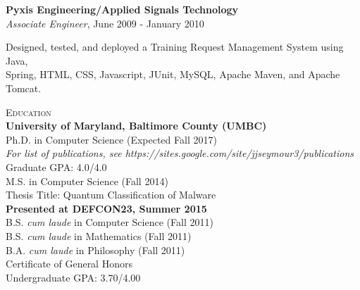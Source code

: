 \atab \textbf{Pyxis Engineering/Applied Signals Technology}\\
\btab \textit{Associate Engineer}, June 2009 - January 2010\\
\begin{my_list}
\item Designed, tested, and deployed a Training Request Management System using Java,\\ \tab \tab  Spring, HTML, CSS, Javascript, JUnit, MySQL, Apache Maven, and Apache Tomcat.
\end{my_list}

\medskip
\textsc{Education}\\
\atab \textbf{University of Maryland, Baltimore County (UMBC)}\\
\btab Ph.D. in Computer Science (Expected Fall 2017)\\
\ctab \emph{For list of publications, see https://sites.google.com/site/jjseymour3/publications}\\
\ctab Graduate GPA: 4.0/4.0\\
\btab M.S. in Computer Science (Fall 2014)\\
\ctab Thesis Title: Quantum Classification of Malware\\
\ctab \textbf{Presented at DEFCON23, Summer 2015}\\
\btab B.S. \emph{cum laude} in Computer Science (Fall 2011)\\
\btab B.S. \emph{cum laude} in Mathematics (Fall 2011) \\
\btab B.A. \emph{cum laude} in Philosophy (Fall 2011)\\
\btab Certificate of General Honors\\
\ctab Undergraduate GPA: 3.70/4.00\\


